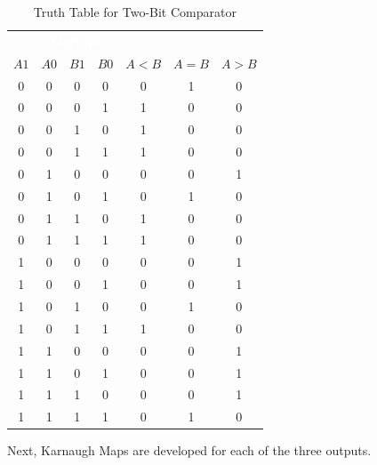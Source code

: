 \begin{table}[H]
	\sffamily
	\newcommand{\head}[1]{\textcolor{white}{\textbf{#1}}}		
	\begin{center}
		\begin{tabular}{cccc|ccc} 
			\rowcolor{black!75}
			\multicolumn{4}{c}{\head{Inputs}} & \multicolumn{3}{c}{\head{Outputs}} \\
			$A1$ & $A0$ & $B1$ & $B0$ & $A<B$ & $A=B$ & $A>B$ \\
			\hline
			0 & 0 & 0 & 0 & 0 & 1 & 0 \\
			0 & 0 & 0 & 1 & 1 & 0 & 0 \\
			0 & 0 & 1 & 0 & 1 & 0 & 0 \\
			0 & 0 & 1 & 1 & 1 & 0 & 0 \\
			0 & 1 & 0 & 0 & 0 & 0 & 1 \\
			0 & 1 & 0 & 1 & 0 & 1 & 0 \\
			0 & 1 & 1 & 0 & 1 & 0 & 0 \\
			0 & 1 & 1 & 1 & 1 & 0 & 0 \\
			1 & 0 & 0 & 0 & 0 & 0 & 1 \\
			1 & 0 & 0 & 1 & 0 & 0 & 1 \\
			1 & 0 & 1 & 0 & 0 & 1 & 0 \\
			1 & 0 & 1 & 1 & 1 & 0 & 0 \\
			1 & 1 & 0 & 0 & 0 & 0 & 1 \\
			1 & 1 & 0 & 1 & 0 & 0 & 1 \\
			1 & 1 & 1 & 0 & 0 & 0 & 1 \\
			1 & 1 & 1 & 1 & 0 & 1 & 0 
		\end{tabular}
	\end{center}
	\caption{Truth Table for Two-Bit Comparator}
	\label{08:tab:two_bit_comparator}
\end{table}

Next, Karnaugh Maps are developed for each of the three outputs.



